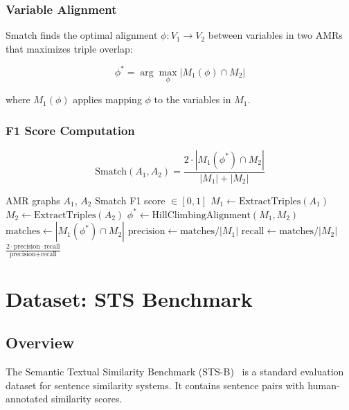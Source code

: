 \documentclass[11pt,a4paper]{article}
\begin{document}
\subsubsection{Variable Alignment}

Smatch finds the optimal alignment $\phi: V_1 \to V_2$ between variables in two AMRs that maximizes triple overlap:

\begin{equation}
\phi^* = \arg\max_{\phi} |M_1(\phi) \cap M_2|
\end{equation}

where $M_1(\phi)$ applies mapping $\phi$ to the variables in $M_1$.

\subsubsection{F1 Score Computation}

\begin{equation}
\text{Smatch}(A_1, A_2) = \frac{2 \cdot |M_1(\phi^*) \cap M_2|}{|M_1| + |M_2|}
\end{equation}

\begin{algorithm}[H]
\caption{Smatch Score Computation}
\begin{algorithmic}[1]
\Require AMR graphs $A_1$, $A_2$
\Ensure Smatch F1 score $\in [0, 1]$
\State $M_1 \gets \text{ExtractTriples}(A_1)$
\State $M_2 \gets \text{ExtractTriples}(A_2)$
\State $\phi^* \gets \text{HillClimbingAlignment}(M_1, M_2)$
\State $\text{matches} \gets |M_1(\phi^*) \cap M_2|$
\State $\text{precision} \gets \text{matches} / |M_1|$
\State $\text{recall} \gets \text{matches} / |M_2|$
\State \Return $\frac{2 \cdot \text{precision} \cdot \text{recall}}{\text{precision} + \text{recall}}$
\end{algorithmic}
\end{algorithm}

\section{Dataset: STS Benchmark}

\subsection{Overview}

The Semantic Textual Similarity Benchmark (STS-B)~\citep{cer2017semeval} is a standard evaluation dataset for sentence similarity systems. It contains sentence pairs with human-annotated similarity scores.
\end{document}

